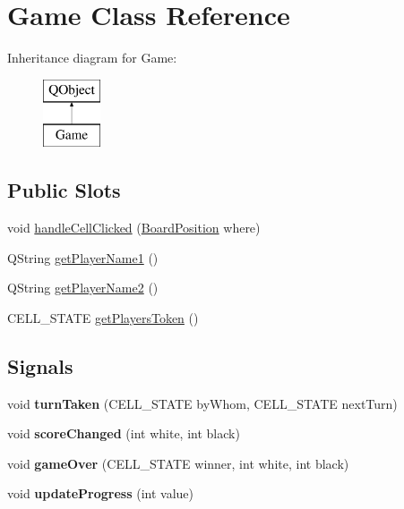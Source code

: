 \hypertarget{class_game}{}\section{Game Class Reference}
\label{class_game}
Inheritance diagram for Game\+:\begin{figure}[H]
\begin{center}
\leavevmode
\includegraphics[height=2.000000cm]{class_game}
\end{center}
\end{figure}
\subsection*{Public Slots}
\begin{DoxyCompactItemize}
\item 
void \hyperlink{class_game_a206137b58ccb5c275619d08a9e90be37}{handle\+Cell\+Clicked} (\hyperlink{struct_board_position}{Board\+Position} where)
\item 
Q\+String \hyperlink{class_game_a5b70ad0ec696020171207825eb1915e4}{get\+Player\+Name1} ()
\item 
Q\+String \hyperlink{class_game_a03d0a6aedd4026beb2904243f0461778}{get\+Player\+Name2} ()
\item 
C\+E\+L\+L\+\_\+\+S\+T\+A\+T\+E \hyperlink{class_game_a47199b797f99bc4bbc86f286de480a5b}{get\+Players\+Token} ()
\end{DoxyCompactItemize}
\subsection*{Signals}
\begin{DoxyCompactItemize}
\item 
\hypertarget{class_game_a5d0ab94b5dca041df4288469002e56d4}{}void {\bfseries turn\+Taken} (C\+E\+L\+L\+\_\+\+S\+T\+A\+T\+E by\+Whom, C\+E\+L\+L\+\_\+\+S\+T\+A\+T\+E next\+Turn)\label{class_game_a5d0ab94b5dca041df4288469002e56d4}

\item 
\hypertarget{class_game_aaf6e4b840c1f2f3eae0fb2cbbe6ab735}{}void {\bfseries score\+Changed} (int white, int black)\label{class_game_aaf6e4b840c1f2f3eae0fb2cbbe6ab735}

\item 
\hypertarget{class_game_a9930b90b8152f151b13b5183081d76f4}{}void {\bfseries game\+Over} (C\+E\+L\+L\+\_\+\+S\+T\+A\+T\+E winner, int white, int black)\label{class_game_a9930b90b8152f151b13b5183081d76f4}

\item 
\hypertarget{class_game_a6f45946e78016e8c0bdf6abb49f39a1a}{}void {\bfseries update\+Progress} (int value)\label{class_game_a6f45946e78016e8c0bdf6abb49f39a1a}

\end{DoxyCompactItemize}
